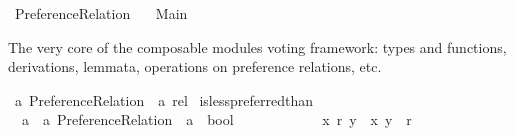%
\begin{isabellebody}%
%
%
\isadelimdocument
\isanewline
%
\endisadelimdocument
%
\isatagdocument
\isanewline
\isanewline
%
\isamarkuptrue%
%
\isamarkuptrue%
%
\endisatagdocument
{\isafolddocument}%
%
\isadelimdocument
%
\endisadelimdocument
%
\isadelimtheory
%
\endisadelimtheory
%
\isatagtheory
{}\isamarkupfalse%
\ Preference{\isacharunderscore}{\kern0pt}Relation\isanewline
\ \ \ Main\isanewline
{}%
\endisatagtheory
{\isafoldtheory}%
%
\isadelimtheory
%
\endisadelimtheory
%
\begin{isamarkuptext}%
The very core of the composable modules voting framework: types and
functions, derivations, lemmata, operations on preference relations, etc.%
\end{isamarkuptext}\isamarkuptrue%
%
\isadelimdocument
%
\endisadelimdocument
%
\isatagdocument
%
\isamarkuptrue%
%
\endisatagdocument
{\isafolddocument}%
%
\isadelimdocument
%
\endisadelimdocument
{}\isamarkupfalse%
\ {\isacharprime}{\kern0pt}a\ Preference{\isacharunderscore}{\kern0pt}Relation\ {\isacharequal}{\kern0pt}\ {\isachardoublequoteopen}{\isacharprime}{\kern0pt}a\ rel{\isachardoublequoteclose}\isanewline
\isanewline
{}\isamarkupfalse%
\ is{\isacharunderscore}{\kern0pt}less{\isacharunderscore}{\kern0pt}preferred{\isacharunderscore}{\kern0pt}than\ {\isacharcolon}{\kern0pt}{\isacharcolon}{\kern0pt}\isanewline
\ \ {\isachardoublequoteopen}{\isacharprime}{\kern0pt}a\ {\isasymRightarrow}\ {\isacharprime}{\kern0pt}a\ Preference{\isacharunderscore}{\kern0pt}Relation\ {\isasymRightarrow}\ {\isacharprime}{\kern0pt}a\ {\isasymRightarrow}\ bool{\isachardoublequoteclose}\ {\isacharparenleft}{\kern0pt}{\isachardoublequoteopen}{\isacharunderscore}{\kern0pt}\ {\isasympreceq}\isactrlsub {\isacharunderscore}{\kern0pt}\ {\isacharunderscore}{\kern0pt}{\isachardoublequoteclose}\ {\isacharbrackleft}{\kern0pt}{}{}{\isacharcomma}{\kern0pt}\ {}{}{}{}{\isacharcomma}{\kern0pt}\ {}{}{\isacharbrackright}{\kern0pt}\ {}{}{\isacharparenright}{\kern0pt}\ \isanewline
\ \ \ \ {\isachardoublequoteopen}x\ {\isasympreceq}\isactrlsub r\ y\ {\isacharequal}{\kern0pt}\ {\isacharparenleft}{\kern0pt}{\isacharparenleft}{\kern0pt}x{\isacharcomma}{\kern0pt}\ y{\isacharparenright}{\kern0pt}\ {\isasymin}\ r{\isacharparenright}{\kern0pt}{\isachardoublequoteclose}\isanewline

\end{isabellebody}
